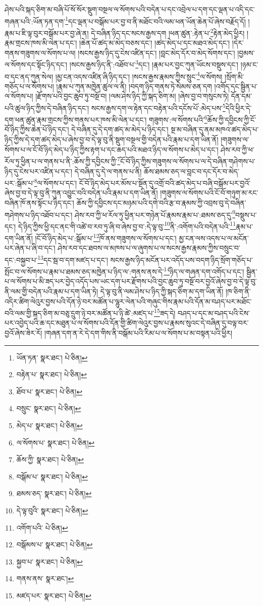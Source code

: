 ཤེས་པའི་སྐད་ཅིག་མ་བཞི་པོ་སོ་སོར་སྡུག་བསྔལ་ལ་སོགས་པའི་བདེན་པ་དང་འབྲེལ་པ་དག་དང་ལྡན་པ་འདི་དང་གཞན་པའི་:ཡོན་ཏན་དག་\footnote{ཡོན་ཏན་  སྣར་ཐང་།  པེ་ཅིན། }དང་ལྡན་པ་བསྒོམ་པར་བྱ་བ་ནི་མཐོང་བའི་ལམ་ཕན་ཡོན་ཆེན་པོ་ཞེས་བརྗོད་དོ། །རྣམ་པ་ཇི་ལྟ་བུར་བསྒོམ་པར་བྱ་ཞེ་ན། དེ་བཞིན་ཉིད་དང་སངས་རྒྱས་དག །ཕན་ཚུན་:རྟེན་པ་\footnote{བརྟེན་པ་  སྣར་ཐང་།  པེ་ཅིན། }རྟེན་མེད་ཕྱིར། །རྣམ་གྲངས་ཁས་མི་ལེན་པ་དང་། །ཆེན་པོ་ཚད་མ་མེད་བཅས་དང་། །ཚད་མེད་པ་དང་མཐའ་མེད་དང་། །དེར་གནས་གཟུགས་ལ་སོགས་པ་ལ། །སངས་རྒྱས་ཉིད་དུ་ངེས་འཛིན་དང་། །བླང་མེད་དོར་བ་མེད་སོགས་དང་། །བྱམས་ལ་སོགས་དང་སྟོང་ཉིད་དང་། །སངས་རྒྱས་ཉིད་ནི་:འཐོབ་པ་\footnote{ཐོབ་པ་  སྣར་ཐང་།  པེ་ཅིན། }དང་། །རྣམ་པར་བྱང་ཀུན་ཡོངས་བསྡུས་དང་། །ཉམ་ང་བ་དང་ནད་ཀུན་སེལ། །མྱ་ངན་འདས་འཛིན་ཞི་ཉིད་དང་། །སངས་རྒྱས་རྣམས་ཀྱིས་སྲུང་\footnote{བསྲུང་  སྣར་ཐང་།  པེ་ཅིན། }ལ་སོགས། །སྲོག་མི་གཅོད་པ་ལ་སོགས་པ། །རྣམ་པ་ཀུན་མཁྱེན་ཚུལ་ལ་ནི། །བདག་ཉིད་གནས་ཏེ་སེམས་ཅན་དག །འགོད་དང་སྦྱིན་པ་ལ་སོགས་པ། །རྫོགས་པའི་བྱང་ཆུབ་ཏུ་བསྔོ་བ། །ལམ་ཤེས་ཉིད་ཀྱི་སྐད་ཅིག་མ། །ཞེས་བྱ་བ་གསུངས་ཏེ། དོན་དམ་པའི་ཚུལ་ཉིད་ཀྱིས་དེ་བཞིན་ཉིད་དང་། སངས་རྒྱས་དག་ལ་རྟེན་དང་བརྟེན་པའི་དངོས་པོ་:མེད་པས་\footnote{མེད་པ་  སྣར་ཐང་།  པེ་ཅིན། }དེའི་ཕྱིར་དེ་དག་ཕན་ཚུན་རྣམ་གྲངས་ཀྱིས་གནས་པར་ཁས་མི་ལེན་པ་དང་། གཟུགས་:ལ་སོགས་པའི་\footnote{ལ་སོགས་པ་  སྣར་ཐང་།  པེ་ཅིན། }ཆོས་ཀྱི་དབྱིངས་ཀྱི་ངོ་བོ་ཉིད་ཀྱིས་ཆེན་པོ་ཉིད་དང་། དེ་བཞིན་དུ་དེ་དག་ཚད་མ་མེད་པ་ཉིད་དང་། སྔ་མ་བཞིན་དུ་ནམ་མཁའ་ཚད་མེད་པ་ཉིད་ཀྱིས་དེ་དག་ཚད་མེད་པ་ཞེས་བྱ་བ་དེ་ལྟ་བུ་ནི་སྡུག་བསྔལ་གྱི་བདེན་པའི་རྣམ་པ་དག་ཡིན་ནོ། །གཟུགས་ལ་སོགས་པ་ལ་ངོ་བོ་ཉིད་མེད་པ་ཉིད་ཀྱིས་རྟག་པ་དང་ཆད་པའི་མཐའ་ཉིད་ལ་སོགས་པ་མེད་པ་དང་། ཤེས་རབ་ཀྱི་ཕ་རོལ་ཏུ་ཕྱིན་པ་ལ་གནས་པ་ནི་:ཆོས་ཀྱི་དབྱིངས་ཀྱི་\footnote{ཆོས་ཀྱི་  སྣར་ཐང་།  པེ་ཅིན། }ངོ་བོ་ཉིད་ཀྱིས་གཟུགས་ལ་སོགས་པ་ལ་དེ་བཞིན་གཤེགས་པ་ཉིད་དུ་ངེས་པར་འཛིན་པ་དང་། དེ་བཞིན་དུ་དེ་ལ་གནས་པ་ནི། ཆོས་ཐམས་ཅད་ལ་བླང་བ་དང་དོར་བ་མེད་པར་:སྒོམ་པ་\footnote{བསྒོམ་པ་  སྣར་ཐང་།  པེ་ཅིན། }ལ་སོགས་པ་དང་། ངོ་བོ་ཉིད་མེད་པར་མོས་པ་སྔོན་དུ་འགྲོ་བའི་ཚད་མེད་པ་བཞི་བསྒོམ་པར་བྱའོ་ཞེས་བྱ་བ་དེ་ལྟ་བུ་ནི་ཀུན་འབྱུང་བའི་བདེན་པའི་རྣམ་པ་དག་ཡིན་ནོ། །གཟུགས་ལ་སོགས་པའི་ངོ་བོ་གཉུག་མ་རང་བཞིན་ཁོ་ནས་སྟོང་པ་ཉིད་དང་། ཆོས་ཀྱི་དབྱིངས་དང་མཉམ་པའི་དགེ་བའི་རྩ་བ་རྣམས་ཀྱི་འབྲས་བུ་དེ་བཞིན་གཤེགས་པ་ཉིད་འཐོབ་པ་དང་། ཤེས་རབ་ཀྱི་ཕ་རོལ་ཏུ་ཕྱིན་པར་གཉེན་པོ་རྣམས་རྣམ་པ་:ཐམས་ཅད་དུ་\footnote{ཐམས་ཅད་  སྣར་ཐང་།  པེ་ཅིན། }བསྡུས་པ་དང་། དེ་ཉིད་ཀྱིས་ཕྱི་དང་ནང་གི་འཚེ་བ་རབ་ཏུ་ཞི་བ་ཞེས་བྱ་བ་:དེ་ལྟ་བུ་\footnote{དེ་ལྟ་བུའི་  སྣར་ཐང་།  པེ་ཅིན། }ནི་:འགོག་པའི་བདེན་པའི་\footnote{འགོག་པའི་  པེ་ཅིན། }རྣམ་པ་དག་ཡིན་ནོ། །ངོ་བོ་ཉིད་མེད་པ་:སྒོམ་པ་\footnote{བསྒོམས་པ་  སྣར་ཐང་།  པེ་ཅིན། }ཁོ་ནས་གཟུགས་ལ་སོགས་པ་དང་། མྱ་ངན་ལས་འདས་པ་ལ་མངོན་པར་ཞེན་པ་ཞི་བ་དང་། ཤེས་རབ་དང་ཐབས་ལ་མཁས་པ་ལ་ཞུགས་པ་ལ་སངས་རྒྱས་རྣམས་ཀྱིས་བསྲུང་བ་དང་:བསྐྱབ་པ་\footnote{སྐྱབ་པ་  སྣར་ཐང་།  པེ་ཅིན། }དང་སྦ་བ་དག་མཛད་པ་དང་། སངས་རྒྱས་ཉིད་མངོན་པར་འདོད་པས་བདག་ཉིད་སྲོག་གཅོད་པ་སྤོང་བ་ལ་སོགས་པ་རྣམ་པ་ཐམས་ཅད་མཁྱེན་པ་ཉིད་ལ་:གནས་ནས་དེ་\footnote{གནས་ནས་  སྣར་ཐང་། }ཉིད་ལ་གཞན་དག་འགོད་པ་དང་། སྦྱིན་པ་ལ་སོགས་པ་མི་ཟད་པར་བྱེད་འདོད་པས་ཡང་དག་པར་རྫོགས་པའི་བྱང་ཆུབ་ཏུ་བསྔོ་བར་བྱའོ་ཞེས་བྱ་བ་དེ་ལྟ་བུ་ནི་ལམ་གྱི་བདེན་པའི་རྣམ་པ་དག་ཡིན་ཏེ། དེ་ལྟ་བུ་ནི་ལམ་ཤེས་པ་ཉིད་ཀྱི་སྐད་ཅིག་མ་དག་ཡིན་ནོ། །ཁ་ཅིག་ནི་འདིར་ཚིག་ལེའུར་བྱས་པའི་དོན་ཉེ་བར་མཚོན་པ་ལྷུར་ལེན་པའི་གཞུང་གིས་རྣམ་པའི་དོན་མ་བཤད་པར་མཐོང་བའི་ལམ་གྱི་སྐད་ཅིག་མ་བཅུ་དྲུག་ཉེ་བར་མཚོན་པ་ཉི་ཚེ་:མཛད་པ་\footnote{མཛད་པར་  སྣར་ཐང་།  པེ་ཅིན། }ཟད་དེ། བཤད་པ་དང་མ་བཤད་པའི་ངེས་པར་འབྱེད་པའི་ཆ་དང་མཐུན་པ་ལ་སོགས་པའི་དོན་གྱི་ཚིག་ལེའུར་བྱས་པ་རྣམས་སུའང་དེ་བཞིན་དུ་བལྟ་བར་བྱའོ་ཞེས་ཟེར་རོ། །གཞན་དག་ན་རེ་དེ་དག་གིས་ནི་བསྒོམ་པའི་རིམ་པ་ལ་སོགས་པ་མ་བསྟན་པའི་ཕྱིར། 